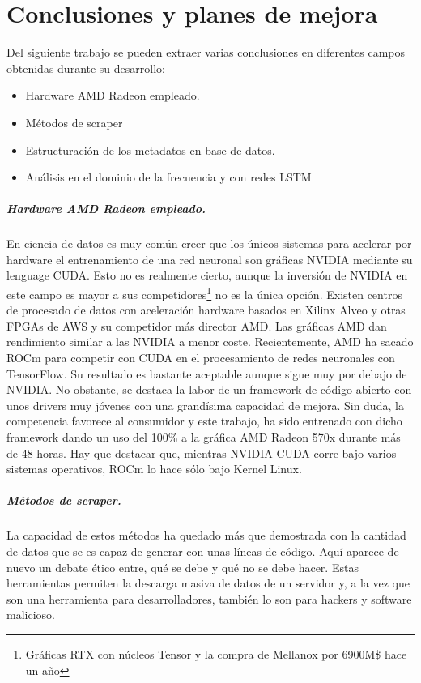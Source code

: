 \chapter{Conclusiones y planes de mejora}\label{cp: conclusions}
Del siguiente trabajo se pueden extraer varias conclusiones en diferentes campos obtenidas durante su desarrollo:
\begin{itemize}
	\item Hardware \gls{AMD} Radeon empleado.
	\item Métodos de \gls{scraper}
	\item Estructuración de los metadatos en base de datos.
	\item Análisis en el dominio de la frecuencia y con redes \gls{LSTM}
\end{itemize}
\paragraph{Hardware \gls{AMD} Radeon empleado.} En ciencia de datos es muy común creer que los únicos sistemas para acelerar por hardware el entrenamiento de una red neuronal son gráficas NVIDIA mediante su lenguage CUDA. Esto no es realmente cierto, aunque la inversión de NVIDIA en este campo es mayor a sus competidores\footnote{Gráficas RTX con núcleos Tensor y la compra de Mellanox por 6900M\$ hace un año} no es la única opción. Existen centros de procesado de datos con aceleración hardware basados en Xilinx Alveo y otras \glspl{FPGA} de \gls{AWS} y su competidor más director \gls{AMD}. Las gráficas \gls{AMD} dan rendimiento similar a las NVIDIA a menor coste. Recientemente, \gls{AMD} ha sacado \gls{ROCm} para competir con CUDA en el procesamiento de redes neuronales con TensorFlow. Su resultado es bastante aceptable aunque sigue muy por debajo de NVIDIA. No obstante, se destaca la labor de un framework de código abierto con unos drivers muy jóvenes con una grandísima capacidad de mejora. Sin duda, la competencia favorece al consumidor y este trabajo, ha sido entrenado con dicho framework dando un uso del 100\% a la gráfica \gls{AMD} Radeon 570x durante más de 48 horas. Hay que destacar que, mientras NVIDIA CUDA corre bajo varios sistemas operativos, \gls{ROCm} lo hace sólo bajo Kernel Linux\cite{rocm}.

\paragraph{Métodos de \gls{scraper}.} La capacidad de estos métodos ha quedado más que demostrada con la cantidad de datos que se es capaz de generar con unas líneas de código. Aquí aparece de nuevo un debate ético entre, qué se debe y qué no se debe hacer. Estas herramientas permiten la descarga masiva de datos de un servidor y, a la vez que son una herramienta para desarrolladores, también lo son para hackers y software malicioso.

